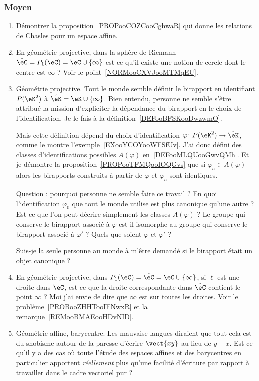 \subsubsection{Moyen}

\begin{enumerate}
    \item
        Démontrer la proposition~\ref{PROPooCOZCooCghwaR} qui donne les relations de Chasles pour un espace affine.
    \item
        En géométrie projective, dans la sphère de Riemann \( \hat\eC=P_1(\eC)=\eC\cup\{ \infty \}\) est-ce qu'il existe une notion de cercle dont le centre est \( \infty\) ? Voir le point~\ref{NORMooCXVJooMTMqEU}.
    \item
        Géométrie projective. Tout le monde semble définir le birapport en identifiant \( P(\eK^2)\) à \( \hat\eK=\eK\cup\{ \infty \}\). Bien entendu, personne ne semble s'être attribué la mission d'expliciter la dépendance du birapport en le choix de l'identification. Je le fais à la définition~\ref{DEFooBFSKooDwzwmO}.

        Mais cette définition dépend du choix d'identification \( \varphi\colon P(\eK^2)\to \hat\eK\), comme le montre l'exemple~\ref{EXooYCOYooWFSfUv}. J'ai donc défini des classes d'identifications possibles \( A(\varphi)\) en~\ref{DEFooMLQUooGwvQMh}. Et je démontre la proposition~\ref{PROPooTFMQooIOQGvs} que si \( \varphi_a\in A(\varphi)\) alors les birapports construits à partir de \( \varphi\) et \( \varphi_a\) sont identiques.

        Question : pourquoi personne ne semble faire ce travail ? En quoi l'identification \( \varphi_0\) que tout le monde utilise est plus canonique qu'une autre ? Est-ce que l'on peut décrire simplement les classes \( A(\varphi)\) ? Le groupe qui conserve le birapport associé à \( \varphi\) est-il isomorphe au groupe qui conserve le birapport associé à \( \varphi'\) ? Quels que soient \( \varphi\) et \( \varphi'\) ?

        Suis-je la seule personne au monde à m'être demandé si le birapport était un objet canonique ?
    \item
        En géométrie projective, dans \( P_1(\eC)=\hat\eC=\eC\cup\{ \infty \}\), si \( \ell\) est une droite dans \( \eC\), est-ce que la droite correspondante dans \( \hat\eC\) contient le point \( \infty\) ? Moi j'ai envie de dire que \( \infty\) est sur toutes les droites. Voir le problème~\ref{PROBooZHHTooIFNwxR} et la remarque~\ref{REMooBMAEooHDvNID}.

    \item
        Géométrie affine, barycentre. Les mauvaise langues diraient que tout cela est du snobisme autour de la paresse d'écrire \( \vect{ xy }\) au lieu de \( y-x\). Est-ce qu'il y a des cas où toute l'étude des espaces affines et des barycentres en particulier apportent \emph{réellement} plus qu'une facilité d'écriture par rapport à travailler dans le cadre vectoriel pur ?
\end{enumerate}


